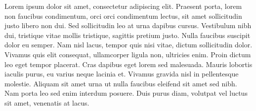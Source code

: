 \documentclass[12pt]{article}
\begin{document}
Lorem ipsum dolor sit amet, consectetur adipiscing elit. Praesent porta, lorem non faucibus condimentum, orci orci condimentum lectus, sit amet sollicitudin justo libero non dui. Sed sollicitudin leo at urna dapibus cursus. Vestibulum nibh dui, tristique vitae mollis tristique, sagittis pretium justo. Nulla faucibus suscipit dolor eu semper. Nam nisl lacus, tempor quis nisi vitae, dictum sollicitudin dolor. Vivamus quis elit consequat, ullamcorper ligula non, ultricies enim. Proin dictum leo eget tempor placerat. Cras dapibus eget lorem sed malesuada. Mauris lobortis iaculis purus, eu varius neque lacinia et. Vivamus gravida nisl in pellentesque molestie. Aliquam sit amet urna ut nulla faucibus eleifend sit amet sed nibh. Nam porta leo sed enim interdum posuere. Duis purus diam, volutpat vel luctus sit amet, venenatis at lacus. 
\end{document}
